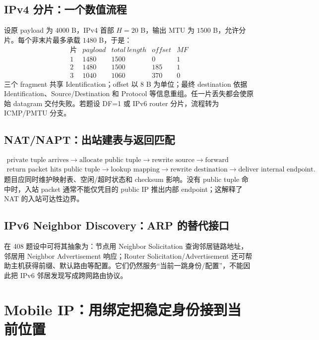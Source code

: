 \documentclass[11pt,a4paper]{ctexart}
\begin{document}
\subsection{IPv4 分片：一个数值流程}

设原 payload 为 $4000$ B，IPv4 首部 $H=20$ B，输出 MTU 为 $1500$ B，允许分片。每个非末片最多承载 $1480$ B，于是：
\[
\begin{array}{c|c|c|c|c}
片 & payload & total\ length & offset & MF\\\hline
1&1480&1500&0&1\\
2&1480&1500&185&1\\
3&1040&1060&370&0
\end{array}
\]
三个 fragment 共享 Identification；offset 以 8 B 为单位；最终 destination 依据 Identification、Source/Destination 和 Protocol 等信息重组。任一片丢失都会使原始 datagram 交付失败。若题设 DF=1 或 IPv6 router 分片，流程转为 ICMP/PMTU 分支。

\subsection{NAT/NAPT：出站建表与返回匹配}

\[
\begin{gathered}
\text{private tuple arrives}\to\text{allocate public tuple}\to\text{rewrite source}\to\text{forward}\\
\text{return packet hits public tuple}\to\text{lookup mapping}\to\text{rewrite destination}\to\text{deliver internal endpoint}.
\end{gathered}
\]
题目应同时维护映射表、空闲/超时状态和 checksum 影响。没有 public tuple 命中时，入站 packet 通常不能仅凭目的 public IP 推出内部 endpoint；这解释了 NAT 的入站可达性边界。

\subsection{IPv6 Neighbor Discovery：ARP 的替代接口}

在 408 题设中可将其抽象为：节点用 Neighbor Solicitation 查询邻居链路地址，邻居用 Neighbor Advertisement 响应；Router Solicitation/Advertisement 还可帮助主机获得前缀、默认路由等配置。它们仍然服务“当前一跳身份/配置”，不能因此把 IPv6 邻居发现写成跨网路由协议。

\section{Mobile IP：用绑定把稳定身份接到当前位置}
\end{document}
